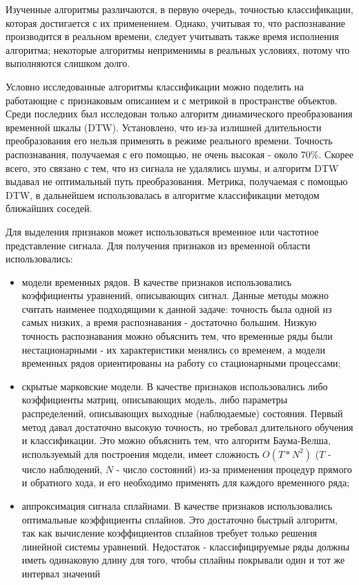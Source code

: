 Изученные алгоритмы различаются, в первую очередь, точностью классификации, которая достигается с их применением. Однако, учитывая то, что распознавание производится в реальном времени, следует учитывать также время исполнения алгоритма; некоторые алгоритмы неприменимы в реальных условиях, потому что выполняются слишком долго.

Условно исследованные алгоритмы классификации можно поделить на работающие с признаковым описанием и с метрикой в пространстве объектов. Среди последних был исследован только алгоритм динамического преобразования временной шкалы (DTW). Установлено, что из-за излишней длительности преобразования его нельзя применять в режиме реального времени. Точность распознавания, получаемая с его помощью, не очень высокая - около 70\%. Скорее всего, это связано с тем, что из сигнала не удалялись шумы, и алгоритм DTW выдавал не оптимальный путь преобразования. Метрика, получаемая с помощью DTW, в дальнейшем использовалась в алгоритме классификации методом ближайших соседей.

Для выделения признаков может использоваться временное или частотное представление сигнала. Для получения признаков из временной области использовались:
\begin{itemize}
\item модели временных рядов. В качестве признаков использовались коэффициенты уравнений, описывающих сигнал. Данные методы можно считать наименее подходящими к данной задаче: точность была одной из самых низких, а время распознавания - достаточно большим. Низкую точность распознавания можно объяснить тем, что временные ряды были нестационарными - их характеристики менялись со временем, а модели временных рядов ориентированы на работу со стационарными процессами;
\item скрытые марковские модели. В качестве признаков использовались либо коэффициенты матриц, описывающих модель, либо параметры распределений, описывающих выходные (наблюдаемые) состояния. Первый метод давал достаточно высокую точность, но требовал длительного обучения и классификации. Это можно объяснить тем, что алгоритм Баума-Велша, используемый для построения модели, имеет сложность $O(T*N^2)$ ($T$ - число наблюдений, $N$ - число состояний) из-за применения процедур прямого и обратного хода, и его необходимо применять для каждого временного ряда;
\item аппроксимация сигнала сплайнами. В качестве признаков использовались оптимальные коэффициенты сплайнов. Это достаточно быстрый алгоритм, так как вычисление коэффициентов сплайнов требует только решения линейной системы уравнений. Недостаток - классифицируемые ряды должны иметь одинаковую длину для того, чтобы сплайны покрывали один и тот же интервал значений
\end{itemize}

